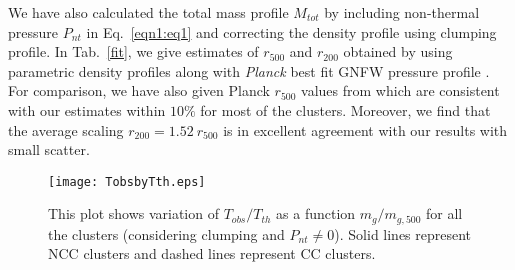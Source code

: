 \documentclass[a4paper,fleqn,usenatbib]{mnras}
\begin{document}
We have also calculated the total mass profile $M_{tot}$ by including non-thermal pressure $P_{nt}$ in Eq.~\ref{eqn1:eq1} and correcting the density profile using  \cite{Eckert2015} clumping profile.
In Tab.~\ref{fit}, we give estimates  of $r_{500}$ and $r_{200}$ obtained by using parametric  density profiles along with {\it Planck} best fit GNFW pressure profile \citep{Planck2013a}. 
For comparison, we have also given Planck $r_{500}$ values from \cite{Planck2011} which are consistent with our estimates within $10\%$  for most of the clusters.
Moreover, we find that the average scaling $r_{200}=1.52~r_{500}$ \citep{Pointecouteau2005,11,Eckert2013a} is in excellent agreement with our results with small scatter.
\begin{figure}
\begin{minipage}{8.5cm}
\texttt{[image: TobsbyTth.eps]}
\end{minipage}
\caption{This plot shows variation of $T_{obs}/T_{th}$ as a function  $m_g/m_{g,500}$ for all the clusters (considering clumping and $P_{nt}\neq 0$). Solid lines represent NCC clusters and dashed lines represent CC clusters.}
\label{Tobs_by_Tth}
\end{figure} 
\end{document}
